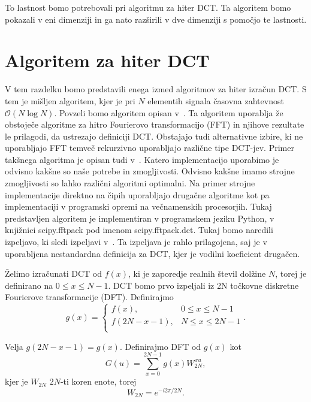\documentclass[a4paper,12pt,openright]{book}
\begin{document}
To lastnost bomo potrebovali pri algoritmu za hiter DCT. Ta algoritem bomo pokazali v eni dimenziji in ga nato razširili v dve dimenziji s pomočjo te lastnosti.

\section{Algoritem za hiter DCT}\label{Algoritem za hiter DCT}
V tem razdelku bomo predstavili enega izmed algoritmov za hiter izračun DCT. S tem je mišljen algoritem, kjer je pri $N$ elementih signala časovna zahtevnost $\mathcal{O}(N\log{}N)$. Povzeli bomo algoritem opisan v~\cite{FastDCT}.
Ta algoritem uporablja že obstoječe algoritme za hitro Fourierovo transformacijo (FFT) in njihove rezultate le prilagodi, da ustrezajo definiciji DCT. Obstajajo tudi alternativne izbire, ki ne uporabljajo FFT temveč rekurzivno uporabljajo različne tipe DCT-jev. Primer takšnega algoritma je opisan tudi v~\cite{britanak2010discrete}. Katero implementacijo uporabimo je odvisno kakšne so naše potrebe in zmogljivosti. Odvisno kakšne imamo strojne zmogljivosti so lahko različni algoritmi optimalni. Na primer strojne implementacije direktno na čipih uporabljajo drugačne algoritme kot pa implementaciji v programski opremi na večnamenskih procesorjih. Tukaj predstavljen algoritem je implementiran v programskem jeziku Python, v knjižnici scipy.fftpack pod imenom scipy.fftpack.dct. Tukaj bomo naredili izpeljavo, ki sledi izpeljavi v~\cite{FastDCT}. Ta izpeljava je rahlo prilagojena, saj je v~\cite{FastDCT} uporabljena nestandardna definicija za DCT, kjer je vodilni koeficient drugačen.\par
Želimo izračunati DCT od $f(x)$, ki je zaporedje realnih števil dolžine $N$, torej je definirano na $0 \leq x \leq N-1$. DCT bomo prvo izpeljali iz 2N točkovne diskretne Fourierove transformacije (DFT). Definirajmo 
\begin{equation}
  g(x)=
    \begin{cases}
          f(x), & 0 \leq x \leq N-1 \\
          f(2N-x-1), & N \leq x \leq 2N-1 \\
    \end{cases}.
\label{eq:fastDCT_y}
\end{equation}

Velja $g(2N-x-1) = g(x)$.
Definirajmo DFT od $g(x)$ kot
\begin{equation}
  G(u) = \sum_{x=0}^{2N-1} g(x) W_{2N}^{xu},
\label{eq:DFT}
\end{equation}
kjer je $W_{2N}$ $2N$-ti koren enote, torej
\begin{equation}
  W_{2N} = e^{-i2\pi/2N}.
\label{eq:DFT_W}
\end{equation}
\end{document}
